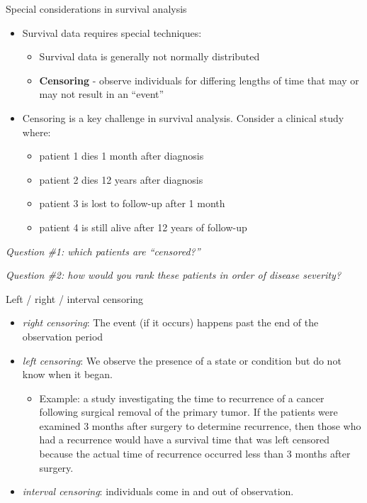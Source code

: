 \documentclass[
  ignorenonframetext,
]{beamer}
\providecommand{\tightlist}{%
  \setlength{\itemsep}{0pt}\setlength{\parskip}{0pt}}
\begin{document}
\begin{frame}{Special considerations in survival analysis}
\protect\hypertarget{special-considerations-in-survival-analysis}{}

\begin{itemize}
\tightlist
\item
  Survival data requires special techniques:

  \begin{itemize}
  \tightlist
  \item
    Survival data is generally not normally distributed
  \item
    \textbf{Censoring} - observe individuals for differing lengths of
    time that may or may not result in an ``event''
  \end{itemize}
\item
  Censoring is a key challenge in survival analysis. Consider a clinical
  study where:

  \begin{itemize}
  \tightlist
  \item
    patient 1 dies 1 month after diagnosis
  \item
    patient 2 dies 12 years after diagnosis
  \item
    patient 3 is lost to follow-up after 1 month
  \item
    patient 4 is still alive after 12 years of follow-up
  \end{itemize}
\end{itemize}

\emph{Question \#1: which patients are ``censored?''}

\emph{Question \#2: how would you rank these patients in order of
disease severity?}

\end{frame}

\begin{frame}{Left / right / interval censoring}
\protect\hypertarget{left-right-interval-censoring}{}

\begin{itemize}
\tightlist
\item
  \emph{right censoring}: The event (if it occurs) happens past the end
  of the observation period
\item
  \emph{left censoring}: We observe the presence of a state or condition
  but do not know when it began.

  \begin{itemize}
  \tightlist
  \item
    Example: a study investigating the time to recurrence of a cancer
    following surgical removal of the primary tumor. If the patients
    were examined 3 months after surgery to determine recurrence, then
    those who had a recurrence would have a survival time that was left
    censored because the actual time of recurrence occurred less than 3
    months after surgery.
  \end{itemize}
\item
  \emph{interval censoring}: individuals come in and out of observation.
\end{itemize}

\end{frame}
\end{document}
